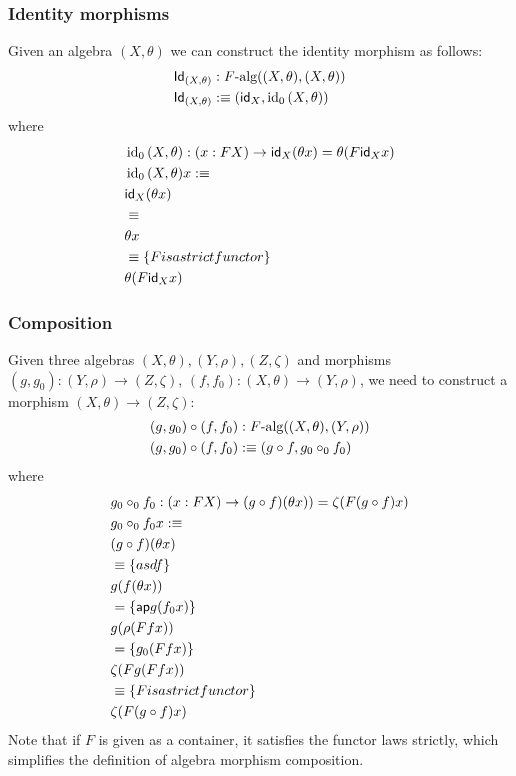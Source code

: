 \documentclass[a4paper,10pt]{article}
\begin{document}
\subsubsection{Identity morphisms}

Given an algebra $(X,\theta)$ we can construct the identity morphism as follows:
%
\begin{align*}
  &\mathsf{Id}_{(X,\theta)} : F\mbox{-alg}((X,\theta),(X,\theta)) \\
  &\mathsf{Id}_{(X,\theta)} :\equiv (\mathsf{id}_{X} , \operatorname*{id_0}{(X,\theta)})
\end{align*}
%
where
%
\begin{align*}
  &\operatorname*{id_0}{(X,\theta)} : (x : FX) \to \mathsf{id}_{X} (\theta x) = \theta (F \mathsf{id}_{X} x) \\
  &\operatorname*{id_0}{(X,\theta)} x :\equiv \\
  &\mathsf{id}_{X} (\theta x) \\
  &\equiv \\
  &\theta x \\
  &\equiv \{ F is a strict functor \} \\
  &\theta (F \mathsf{id}_{X} x)
\end{align*}
%
\subsubsection{Composition}

Given three algebras $(X,\theta), (Y,\rho), (Z,\zeta)$ and morphisms
$(g,g_0) : (Y,\rho) \to (Z,\zeta)$,
$(f,f_0) : (X,\theta) \to (Y,\rho)$, we need to construct a morphism
$(X,\theta) \to (Z,\zeta)$:
%
\begin{align*}
  &(g,g_0) \circ (f,f_0) : F\mbox{-alg}((X,\theta),(Y,\rho)) \\
  &(g,g_0) \circ (f,f_0) :\equiv (g \circ f , g_0 \circ_0 f_0)
\end{align*}
%
where
%
\begin{align*}
  &g_0 \circ_0 f_0 : (x : FX) \to (g \circ f) (\theta x)) = \zeta (F (g \circ f) x) \\
  &g_0 \circ_0 f_0 x :\equiv \\
  &(g \circ f) (\theta x) \\
  &\equiv \{ asdf \} \\
  &g (f (\theta x)) \\
  &= \{ \mathsf{ap} g (f_0 x) \} \\
  &g (\rho (F f x)) \\
  &= \{ g_0 (F f x) \} \\
  &\zeta (F g (F f x)) \\
  &\equiv \{ F is a strict functor \} \\
  &\zeta (F (g \circ f) x)
\end{align*}
%
Note that if $F$ is given as a container, it satisfies the functor
laws strictly, which simplifies the definition of algebra morphism
composition.
\end{document}
